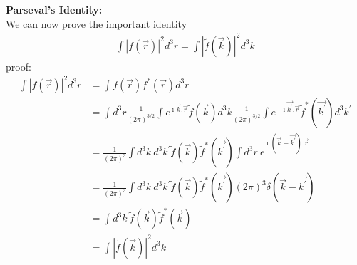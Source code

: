 		\textbf{Parseval's Identity:}\\
		We can now  prove the important identity
		\begin{eqnarray}\label{eqn:118}
			\int |f(\vec{r})|^2 d^3r = \int |\tilde{f}(\vec{k})|^2 d^3k
		\end{eqnarray}
		proof:
		\begin{eqnarray}
			\int |f(\vec{r})|^2 d^3r
			&= \int f(\vec{r}) f^*(\vec{r}) d^3r \nonumber \\
			&= \int d^3r \frac{1}{(2\pi)^{3/2}} \int e^{\imath\vec{k} . \vec{r}} \tilde{f}(\vec{k}) d^3k \frac{1}{(2\pi)^{3/2}} \int e^{-\imath\vec{k^\prime} . \vec{r}} \tilde{f}^*(\vec{k^\prime}) d^3k^\prime \nonumber \\
			&= \frac{1}{(2\pi)^3} \int d^3k\ d^3k^\prime \tilde{f}(\vec{k}) \tilde{f}^*(\vec{k^\prime}) \int d^3r \ e^{\imath(\vec{k} - \vec{k^\prime}).\vec{r}} \nonumber \\
			&= \frac{1}{(2\pi)^3} \int d^3k\ d^3k^\prime \tilde{f}(\vec{k}) \tilde{f}^*(\vec{k^\prime}) (2\pi)^3 \delta(\vec{k} - \vec{k^\prime}) \nonumber \\
			&= \int d^3k\ \tilde{f}(\vec{k}) \tilde{f}^*(\vec{k}) \nonumber \\
			&= \int |\tilde{f}(\vec{k})|^2 d^3k
		\end{eqnarray}
		
		
		
		
		